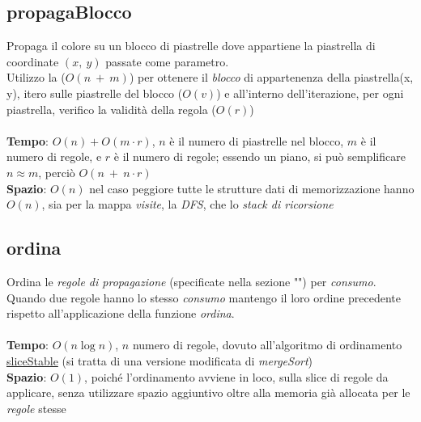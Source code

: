 \documentclass{article}
\begin{document}
\subsection{propagaBlocco}\label{sec:propBlock}
Propaga il colore su un blocco di piastrelle dove appartiene la piastrella di coordinate \((x,\ y)\) passate come parametro.\\
Utilizzo la  (\(O(n\ +\ m)\)) per ottenere il \textit{blocco} di appartenenza della piastrella(x, y), itero sulle piastrelle del blocco (\(O(v)\)) e all'interno dell'iterazione, per ogni piastrella, verifico la validità della regola (\(O(r)\))\\ \\
\textbf{Tempo}: \(O(n) + O(m \cdot r)\), \(n\) è il numero di piastrelle nel blocco, \(m\) è il numero di regole, e \(r\) è il numero di regole; essendo un piano, si può semplificare \(n \approx m\), perciò \(O(n\ +\ n \cdot r)\)\\
\textbf{Spazio}: \(O(n)\) nel caso peggiore tutte le strutture dati di memorizzazione hanno \(O(n)\), sia per la mappa \textit{visite}, la \textit{DFS}, che lo \textit{stack di ricorsione}

\subsection{ordina}
Ordina le \textit{regole di propagazione} (specificate nella sezione "") per \textit{consumo}.\\
Quando due regole hanno lo stesso \textit{consumo} mantengo il loro ordine precedente rispetto all'applicazione della funzione \textit{ordina}.\\ \\
\textbf{Tempo}: \(O(n \log n)\), \(n\) numero di regole, dovuto all'algoritmo di ordinamento \href{https://pkg.go.dev/sort#SliceStable}{sliceStable} (si tratta di una versione modificata di \textit{mergeSort})\\
\textbf{Spazio}: \(O(1)\), poiché l'ordinamento avviene in loco, sulla slice di regole da applicare, senza utilizzare spazio aggiuntivo oltre alla memoria già allocata per le \textit{regole} stesse
\end{document}
